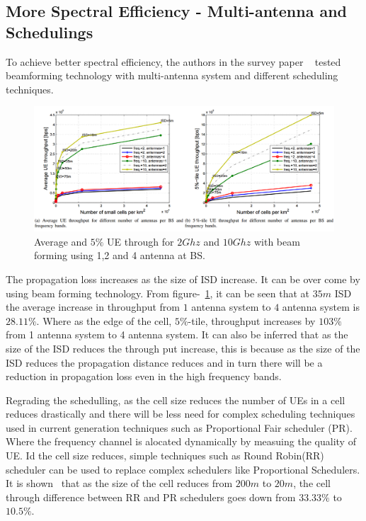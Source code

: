 \documentclass[12pt,onecolumn]{IEEEtran}
\begin{document}
\subsection{More Spectral Efficiency - Multi-antenna and Schedulings}
\label{subsec:MSE}

To achieve better spectral efficiency, the authors in the survey paper ~\cite{main_paper} tested beamforming technology with multi-antenna system and different scheduling techniques.

\begin{figure}[ht]
\includegraphics[scale=0.32]{beam_form}
\centering
\caption{Average and $5\%$ UE through for $2Ghz$ and $10Ghz$ with beam forming using 1,2 and 4 antenna at BS.~\cite{main_paper}}
\label{fig:BF}
\end{figure}

The propagation loss increases as the size of ISD increase. It can be over come by using beam forming technology. From figure-~\ref{fig:BF}, it can be seen that at $35m$ ISD the average increase in throughput from $1$ antenna system to $4$ antenna system is $28.11\%$. Where as the edge of the cell, $5\%$-tile, throughput increases by $103\%$ from 1 antenna system to 4 antenna system. It can also be inferred that as the size of the ISD reduces the through put increase, this is because as the size of the ISD reduces the propagation distance reduces and in turn there will be a reduction in propagation loss even in the high frequency bands.

Regrading the schedulling, as the cell size reduces the number of UEs in a cell reduces drastically and there will be less need for complex scheduling techniques used in current generation techniques such as Proportional Fair scheduler (PR). Where the frequency channel is alocated dynamically by measuing the quality of UE. Id the cell size reduces, simple techniques such as Round Robin(RR) scheduler can be used to replace complex schedulers like Proportional Schedulers. It is shown~\cite{main_paper} that as the size of the cell reduces from $200m$ to $20m$, the cell through difference between RR and PR schedulers goes down from $33.33\%$ to $10.5\%$.
\end{document}
